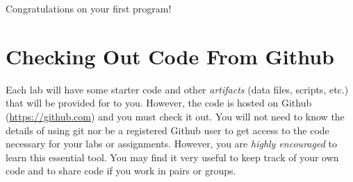 \documentclass[12pt]{scrartcl}
\begin{document}
Congratulations on your first program!

\section{Checking Out Code From Github}

Each lab will have some starter code and other \emph{artifacts} (data files, 
scripts, etc.) that will be provided for to you.  However, the code is hosted
on Github (\url{https://github.com}) and you must check it out.  You will not
need to know the details of using git nor be a registered Github user to 
get access to the code necessary for your labs or assignments.  However, 
you are \emph{highly encouraged} to learn this essential tool.  You may find
it very useful to keep track of your own code and to share code if you work
in pairs or groups.  
\end{document}
